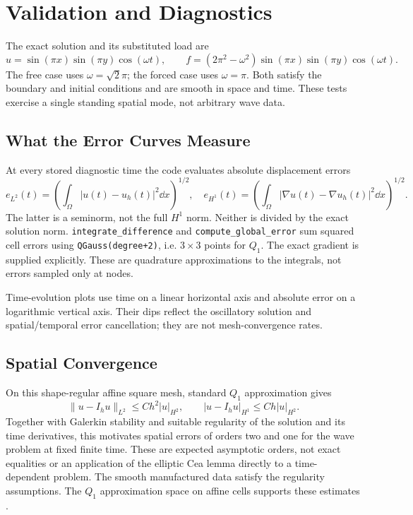 \chapter{Validation and Diagnostics}

The exact solution and its substituted load are
\[
 u=\sin(\pi x)\sin(\pi y)\cos(\omega t),\qquad
 f=(2\pi^2-\omega^2)\sin(\pi x)\sin(\pi y)\cos(\omega t).
\]
The free case uses \(\omega=\sqrt{2}\pi\); the forced case uses \(\omega=\pi\).
Both satisfy the boundary and initial conditions and are smooth in space
and time. These tests exercise a single standing spatial mode, not arbitrary
wave data.

\section{What the Error Curves Measure}
At every stored diagnostic time the code evaluates absolute displacement errors
\[
 e_{L^2}(t)=\left(\int_\Omega|u(t)-u_h(t)|^2\dd x\right)^{1/2},\quad
 e_{H^1}(t)=\left(\int_\Omega|\nabla u(t)-\nabla u_h(t)|^2\dd x\right)^{1/2}.
\]
The latter is a seminorm, not the full \(H^1\) norm. Neither is divided by
the exact solution norm. \texttt{integrate\_difference} and
\texttt{compute\_global\_error} sum squared cell errors using
\texttt{QGauss(degree+2)}, i.e. \(3\times3\) points for \(Q_1\).
The exact gradient is supplied explicitly. These are quadrature approximations
to the integrals, not errors sampled only at nodes.

Time-evolution plots use time on a linear horizontal axis and absolute error
on a logarithmic vertical axis. Their dips reflect the oscillatory solution
and spatial/temporal error cancellation; they are not mesh-convergence rates.

\section{Spatial Convergence}
On this shape-regular affine square mesh, standard \(Q_1\) approximation gives
\[
 \|u-I_hu\|_{L^2}\leq Ch^2|u|_{H^2},\qquad
 |u-I_hu|_{H^1}\leq Ch|u|_{H^2}.
\]
Together with Galerkin stability and suitable regularity of the solution and
its time derivatives, this motivates spatial errors of orders two and one
for the wave problem at fixed finite time. These are expected asymptotic
orders, not exact equalities or an application of the elliptic
Cea lemma directly to a time-dependent problem.
The smooth manufactured data satisfy the regularity assumptions.
The \(Q_1\) approximation space on affine cells supports these estimates
\cite{arnold}.

